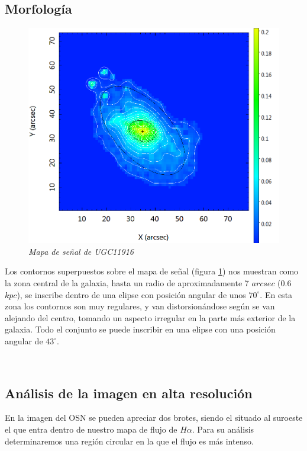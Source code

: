 \documentclass{article}
\newcommand{\hal}{$H\alpha$}
\begin{document}
\subsection{Morfología}
\begin{minipage}[b]{0.4\linewidth}
	\begin{figure}[H]
	\includegraphics[scale=.20]{imagen3.png}
	\centering	
	\caption{\emph{Mapa de señal de UGC11916}}
	\label{figura 3}
	\end{figure}
\end{minipage} \hfill \begin{minipage}[b]{0.4\linewidth} Los contornos superpuestos sobre el mapa de señal (figura \ref{figura 3}) nos muestran como la zona central de la galaxia, hasta un radio de aproximadamente 7 $arcsec$ (0.6 $kpc$), se inscribe dentro de una elipse con posición angular de unos $70^{\circ}$. En esta zona los contornos son muy regulares, y van distorsionándose según se van alejando del centro, tomando un aspecto irregular en la parte más exterior de la galaxia. Todo el conjunto se puede inscribir en una elipse con una posición angular de $43^{\circ}$.
\end{minipage}\\

\subsection{Análisis de la imagen en alta resolución}
En la imagen del OSN se pueden apreciar dos brotes, siendo el situado al suroeste el que entra dentro de nuestro mapa de flujo de \hal. Para su análisis determinaremos una región circular en la que el flujo es más intenso.
\end{document}
